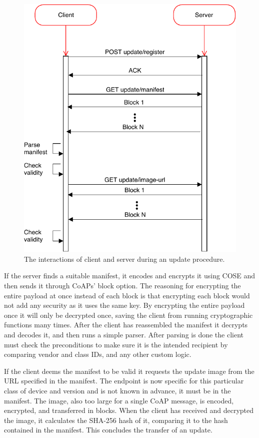 \documentclass[0-thesis.tex]{subfiles}
\begin{document}
\begin{figure}
    \caption{The interactions of client and server during an update procedure.}
    \label{fig:client-server-interaction}
    \includegraphics{images/client-server-sequence.pdf}
\end{figure}

If the server finds a suitable manifest, it encodes and encrypts it using COSE and then
sends it through CoAPs' block option. The reasoning for encrypting the entire payload at
once instead of each block is that encrypting each block would not add any security as it
uses the same key. By encrypting the entire payload once it will only be decrypted once,
saving the client from running cryptographic functions many times. After the client has
reassembled the manifest it decrypts and decodes it, and then runs a simple parser. After
parsing is done the client must check the preconditions to make sure it is the intended
recipient by comparing vendor and class IDs, and any other custom logic.

If the client deems the manifest to be valid it requests the update image from the URL
specified in the manifest. The endpoint is now specific for this particular class of
device and version and is not known in advance, it must be in the manifest. The image,
also too large for a single CoAP message, is encoded, encrypted, and transferred in
blocks. When the client has received and decrypted the image, it calculates the SHA-256
hash of it, comparing it to the hash contained in the manifest. This concludes the
transfer of an update.
\end{document}
